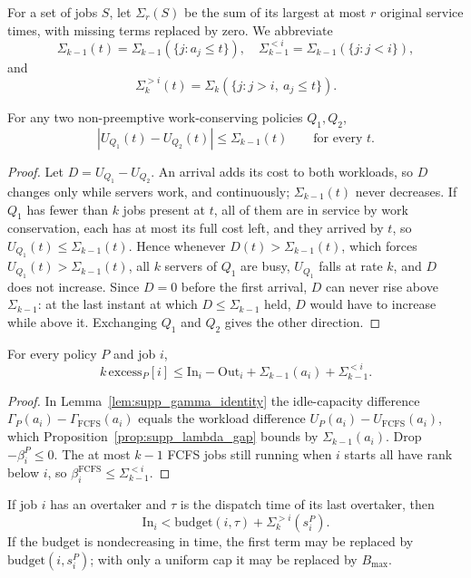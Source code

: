 For a set of jobs $S$, let $\Sigma_r(S)$ be the sum of its largest at most $r$
original service times, with missing terms replaced by zero. We abbreviate
\[
 \Sigma_{k-1}(t)=\Sigma_{k-1}(\{j:a_j\leq t\}),\quad
 \Sigma^{<i}_{k-1}=\Sigma_{k-1}(\{j:j<i\}),
\]
and
\[
 \Sigma^{>i}_{k}(t)=\Sigma_k(\{j:j>i,\ a_j\leq t\}).
\]

\begin{proposition}
\label{prop:supp_lambda_gap}
For any two non-preemptive work-conserving policies $Q_1,Q_2$,
\[
 |U_{Q_1}(t)-U_{Q_2}(t)|\leq\Sigma_{k-1}(t)
 \qquad\text{for every }t.
\]
\end{proposition}

\begin{proof}
Let $D=U_{Q_1}-U_{Q_2}$. An arrival adds its cost to both workloads, so $D$ changes
only while servers work, and continuously; $\Sigma_{k-1}(t)$ never decreases. If
$Q_1$ has fewer than $k$ jobs present at $t$, all of them are in service by work
conservation, each has at most its full cost left, and they arrived by $t$, so
$U_{Q_1}(t)\leq\Sigma_{k-1}(t)$. Hence whenever $D(t)>\Sigma_{k-1}(t)$, which forces
$U_{Q_1}(t)>\Sigma_{k-1}(t)$, all $k$ servers of $Q_1$ are busy, $U_{Q_1}$ falls at rate
$k$, and $D$ does not increase. Since $D=0$ before the first arrival, $D$ can never rise
above $\Sigma_{k-1}$: at the last instant at which $D\leq\Sigma_{k-1}$ held, $D$ would
have to increase while above it. Exchanging $Q_1$ and $Q_2$ gives the other direction.
\end{proof}

\begin{proposition}
\label{prop:supp_lambda_excess}
For every policy $P$ and job $i$,
\[
 k\,\mathrm{excess}_P[i]
 \leq \mathrm{In}_i-\mathrm{Out}_i
 +\Sigma_{k-1}(a_i)+\Sigma^{<i}_{k-1}.
\]
\end{proposition}

\begin{proof}
In Lemma~\ref{lem:supp_gamma_identity} the idle-capacity difference
$\Gamma_P(a_i)-\Gamma_{\mathrm{FCFS}}(a_i)$ equals the workload difference
$U_P(a_i)-U_{\mathrm{FCFS}}(a_i)$, which Proposition~\ref{prop:supp_lambda_gap} bounds by
$\Sigma_{k-1}(a_i)$. Drop $-\beta^P_i\leq0$. The at most $k-1$ FCFS
jobs still running when $i$ starts all have rank below $i$, so
$\beta^{\mathrm{FCFS}}_i\leq\Sigma^{<i}_{k-1}$.
\end{proof}

\begin{proposition}
\label{prop:supp_lambda_in}
If job $i$ has an overtaker and $\tau$ is the dispatch time of its last
overtaker, then
\[
 \mathrm{In}_i
 <\mathrm{budget}(i,\tau)+\Sigma^{>i}_k(s_i^P).
\]
If the budget is nondecreasing in time, the first term may be replaced by
$\mathrm{budget}(i,s_i^P)$; with only a uniform cap it may be replaced by
$B_{\max}$.
\end{proposition}

